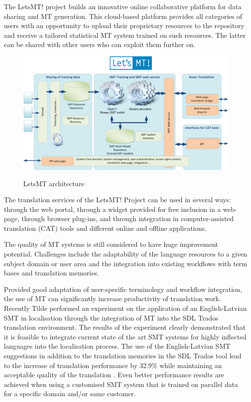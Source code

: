 \begin{multicols}{2}
The LetsMT! project \cite{Meta34} builds an innovative online collaborative platform for data sharing and MT generation.
This cloud-based platform provides all categories of users with an opportunity to upload their proprietary resources to the repository and receive a tailored statistical MT system trained on such resources.
The latter can be shared with other users who can exploit them further on.

\begin{figure}[htb]
  \center
  \includegraphics[width=\textwidth]{../_media/latvian/LetsMT_architecture_EN}
  \caption{LetsMT architecture}
   \label{fig:LetsMT_architecture_EN}
\end{figure}

The translation services of the LetsMT! Project can be used in several ways: through the web portal, through a widget provided for free inclusion in a web-page, through browser plug-ins, and through integration in computer-assisted translation (CAT) tools and different online and offline applications. 

The quality of MT systems is still considered to have huge improvement potential.
Challenges include the adaptability of the language resources to a given subject domain or user area and the integration into existing workflows with term bases and translation memories. 

Provided good adaptation of user-specific terminology and workflow integration, the use of MT can significantly increase productivity of translation work.
Recently Tilde performed an experiment on the application of an English-Latvian SMT in localisation through the integration of MT into the SDL Trados translation environment.
The results of the experiment clearly demonstrated that it is feasible to integrate current state of the art SMT systems for highly inflected languages into the localisation process.
The use of the English-Latvian SMT suggestions in addition to the translation memories in the SDL Trados tool lead to the increase of translation performance by 32.9\% while maintaining an acceptable quality of the translation \cite{Meta35}.
Even better performance results are achieved when using a customised SMT system that is trained on parallel data for a specific domain and/or same customer. 


\end{multicols}

